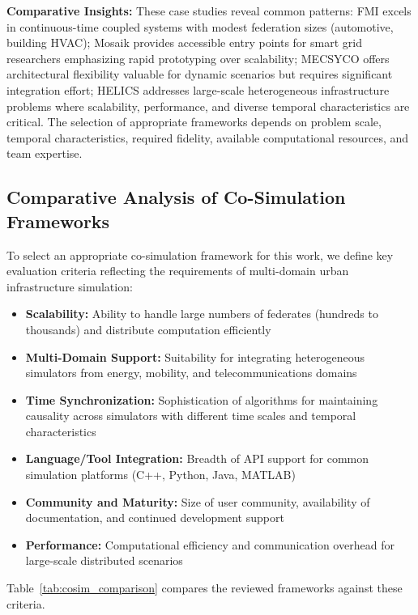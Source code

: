 \textbf{Comparative Insights:} These case studies reveal common patterns: FMI excels in continuous-time coupled systems with modest federation sizes (automotive, building HVAC); Mosaik provides accessible entry points for smart grid researchers emphasizing rapid prototyping over scalability; MECSYCO offers architectural flexibility valuable for dynamic scenarios but requires significant integration effort; HELICS addresses large-scale heterogeneous infrastructure problems where scalability, performance, and diverse temporal characteristics are critical. The selection of appropriate frameworks depends on problem scale, temporal characteristics, required fidelity, available computational resources, and team expertise.


\subsection{Comparative Analysis of Co-Simulation Frameworks}

To select an appropriate co-simulation framework for this work, we define key evaluation criteria reflecting the requirements of multi-domain urban infrastructure simulation:

\begin{itemize}
    \item \textbf{Scalability:} Ability to handle large numbers of federates (hundreds to thousands) and distribute computation efficiently
    \item \textbf{Multi-Domain Support:} Suitability for integrating heterogeneous simulators from energy, mobility, and telecommunications domains
    \item \textbf{Time Synchronization:} Sophistication of algorithms for maintaining causality across simulators with different time scales and temporal characteristics
    \item \textbf{Language/Tool Integration:} Breadth of API support for common simulation platforms (C++, Python, Java, MATLAB)
    \item \textbf{Community and Maturity:} Size of user community, availability of documentation, and continued development support
    \item \textbf{Performance:} Computational efficiency and communication overhead for large-scale distributed scenarios
\end{itemize}

Table~\ref{tab:cosim_comparison} compares the reviewed frameworks against these criteria.

